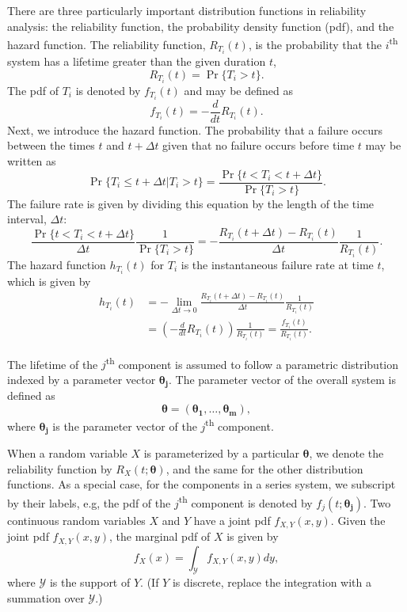 \documentclass[
]{article}
\theoremstyle{definition}
\theoremstyle{plain}
\theoremstyle{definition}
\theoremstyle{definition}
\theoremstyle{definition}
\theoremstyle{definition}
\theoremstyle{remark}
\begin{document}
There are three particularly important distribution functions in reliability analysis: the
reliability function, the probability density function (pdf), and the hazard function.
The reliability function, \(R_{T_i}(t)\), is the
probability that the \(i\)\textsuperscript{th} system has a lifetime greater than
the given duration \(t\),
\begin{equation}
R_{T_i}(t) = \Pr\{T_i > t\}.
\end{equation}
The pdf of \(T_i\) is denoted by \(f_{T_i}(t)\) and may be defined as
\[
    f_{T_i}(t) = -\frac{d}{dt} R_{T_i}(t).
\]
Next, we introduce the hazard function.
The probability that a failure occurs between the times \(t\) and \(t+\Delta t\) given that no
failure occurs before time \(t\) may be written as
\[
\Pr\{T_i \leq t+\Delta t|T_i > t\} = \frac{\Pr\{t < T_i < t+\Delta t\}}{\Pr\{T_i > t\}}.
\]
The failure rate is given by dividing this equation by the length of the time
interval, \(\Delta t\):
\[
\frac{\Pr\{t < T_i < t+\Delta t\}}{\Delta t} \frac{1}{\Pr\{T_i > t\}} =
    -\frac{R_{T_i}(t+\Delta t) - R_{T_i}(t)}{\Delta t} \frac{1}{R_{T_i}(t)}.
\]
The hazard function \(h_{T_i}(t)\) for \(T_i\) is the instantaneous failure rate at time \(t\),
which is given by
\begin{equation}
\label{eq:failure-rate}
\begin{split}
h_{T_i}(t) 
  &= -\lim_{\Delta t \to 0} \frac{R_{T_i}(t+\Delta t) - R_{T_i}(t)}{\Delta t}
    \frac{1}{R_{T_i}(t)}\\
  &= \left(-\frac{d}{dt} R_{T_i}(t)\right) \frac{1}{R_{T_i}(t)} = \frac{f_{T_i}(t)}{R_{T_i}(t)}.
\end{split}
\end{equation}

The lifetime of the \(j\)\textsuperscript{th} component is assumed to follow a parametric distribution indexed
by a parameter vector \(\boldsymbol{\theta_j}\). The parameter vector of the overall system is defined as
\[
    \boldsymbol{\theta }= (\boldsymbol{\theta_1},\ldots,\boldsymbol{\theta_m}),
\]
where \(\boldsymbol{\theta_j}\) is the parameter vector of the \(j\)\textsuperscript{th} component.

When a random variable \(X\) is parameterized by a particular \(\boldsymbol{\theta}\), we denote the
reliability function by \(R_X(t;\boldsymbol{\theta})\), and the same for the other distribution functions.
As a special case, for the components in a series system, we subscript by their labels, e.g,
the pdf of the \(j\)\textsuperscript{th} component is denoted by \(f_j(t;\boldsymbol{\theta_j})\). Two continuous
random variables \(X\) and \(Y\) have a joint pdf \(f_{X,Y}(x,y)\).
Given the joint pdf \(f_{X,Y}(x,y)\), the marginal pdf of \(X\) is given by
\[
f_X(x) = \int_{\mathcal{Y}} f_{X,Y}(x,y) dy,
\]
where \(\mathcal{Y}\) is the support of \(Y\). (If \(Y\) is discrete, replace
the integration with a summation over \(\mathcal{Y}\).)
\end{document}
